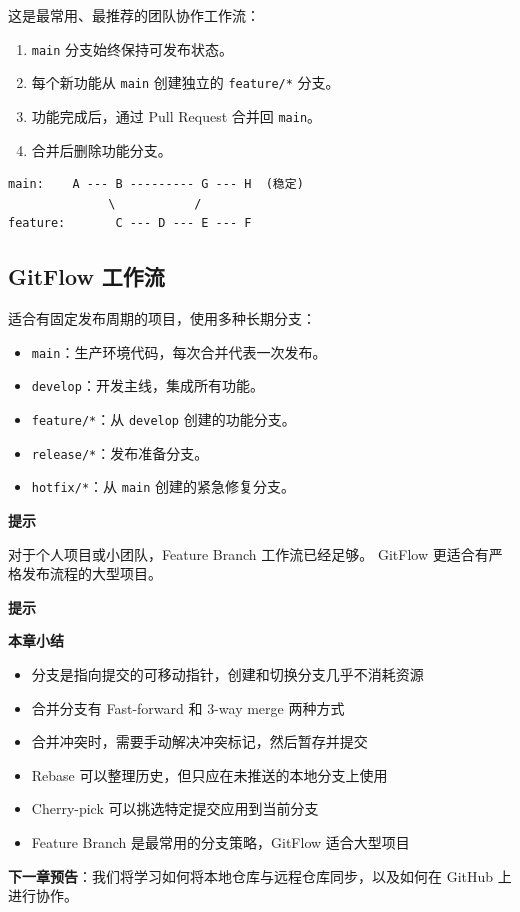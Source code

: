 \documentclass[12pt,a4paper,openany]{ctexbook}
\newenvironment{tipbox}{%
  \medskip
  \noindent\textbf{\faLightbulb\; 提示}
  \smallskip
}{%
  \medskip
}
\begin{document}
这是最常用、最推荐的团队协作工作流：

\begin{enumerate}[leftmargin=2em]
  \item \texttt{main} 分支始终保持可发布状态。
  \item 每个新功能从 \texttt{main} 创建独立的 \texttt{feature/*} 分支。
  \item 功能完成后，通过 Pull Request 合并回 \texttt{main}。
  \item 合并后删除功能分支。
\end{enumerate}

\begin{verbatim}
main:    A --- B --------- G --- H  (稳定)
              \           /
feature:       C --- D --- E --- F
\end{verbatim}

\subsection{GitFlow 工作流}

适合有固定发布周期的项目，使用多种长期分支：

\begin{itemize}[leftmargin=2em]
  \item \texttt{main}：生产环境代码，每次合并代表一次发布。
  \item \texttt{develop}：开发主线，集成所有功能。
  \item \texttt{feature/*}：从 \texttt{develop} 创建的功能分支。
  \item \texttt{release/*}：发布准备分支。
  \item \texttt{hotfix/*}：从 \texttt{main} 创建的紧急修复分支。
\end{itemize}

\begin{tipbox}
对于个人项目或小团队，Feature Branch 工作流已经足够。
GitFlow 更适合有严格发布流程的大型项目。
\end{tipbox}

\begin{tipbox}
\textbf{本章小结}
\begin{itemize}
  \item 分支是指向提交的可移动指针，创建和切换分支几乎不消耗资源
  \item 合并分支有 Fast-forward 和 3-way merge 两种方式
  \item 合并冲突时，需要手动解决冲突标记，然后暂存并提交
  \item Rebase 可以整理历史，但只应在未推送的本地分支上使用
  \item Cherry-pick 可以挑选特定提交应用到当前分支
  \item Feature Branch 是最常用的分支策略，GitFlow 适合大型项目
\end{itemize}

\textbf{下一章预告}：我们将学习如何将本地仓库与远程仓库同步，以及如何在 GitHub 上进行协作。
\end{tipbox}
\end{document}
